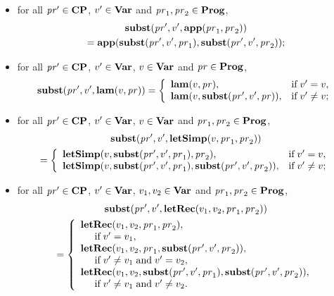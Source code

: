 \begin{itemize}
\item for all $\mathit{pr}'\in\mathbf{CP}$, $v'\in\mathbf{Var}$ and $\mathit{pr}_1,\mathit{pr}_2\in\mathbf{Prog}$,
  \begin{multline*}
    \mathbf{subst}(\mathit{pr}',v',\mathbf{app}(\mathit{pr}_1,\mathit{pr}_2)) \\
    = \mathbf{app}(\mathbf{subst}(\mathit{pr}',v',\mathit{pr}_1),\mathbf{subst}(\mathit{pr}',v',\mathit{pr}_2)) ;
  \end{multline*}

\item for all $\mathit{pr}'\in\mathbf{CP}$, $v'\in\mathbf{Var}$, $v\in\mathbf{Var}$ and
  $\mathit{pr}\in\mathbf{Prog}$,
  \begin{displaymath}
    \subst(\pr',v',\proglam(v,\pr)) =
    \casesdef{\proglam(v,\pr),}{\eqtxtr{if} v'=v ,}%
    {\proglam(v,\subst(\pr',v',\pr)),}{\eqtxtr{if} v'\neq v ;}
  \end{displaymath}

\item for all $\mathit{pr}'\in\mathbf{CP}$, $v'\in\mathbf{Var}$, $v\in\mathbf{Var}$ and
  $\mathit{pr}_1,\mathit{pr}_2\in\mathbf{Prog}$,
  \begin{multline*}
    \subst(\pr',v',\progletSimp(v,\pr_1,\pr_2)) \\
    = \casesdef{\progletSimp(v,\subst(\pr',v',\pr_1),\pr_2),}%
    {\eqtxtr{if} v'=v,}%
    {\progletSimp(v,\subst(\pr',v',\pr_1),\subst(\pr',v',\pr_2)),}%
    {\eqtxtr{if} v'\neq v;}%
  \end{multline*}

\item for all $\mathit{pr}'\in\mathbf{CP}$, $v'\in\mathbf{Var}$, $v_1,v_2\in\mathbf{Var}$ and
  $\mathit{pr}_1,\mathit{pr}_2\in\mathbf{Prog}$,
  \begin{multline*}
    \mathbf{subst}(\mathit{pr}',v',\mathbf{letRec}(v_1,v_2,\mathit{pr}_1,\mathit{pr}_2)) \\
    = \left\{ \begin{array}{l}
        \mathbf{letRec}(v_1,v_2,\mathit{pr}_1,\mathit{pr}_2), \\
        \hspace*{.5cm}\allowbreak\mbox{if}\allowbreak\; v'=v_1, \\
        \mathbf{letRec}(v_1,v_2,\mathit{pr}_1,\mathbf{subst}(\mathit{pr}',v',\mathit{pr}_2)), \\
        \hspace*{.5cm}\allowbreak\mbox{if}\allowbreak\; v'\neq v_1\;\allowbreak\mbox{and}\allowbreak\; v'=v_2 , \\
        \mathbf{letRec}(v_1,v_2,\mathbf{subst}(\mathit{pr}',v',\mathit{pr}_1),
          \mathbf{subst}(\mathit{pr}',v',\mathit{pr}_2)), \\
        \hspace*{.5cm}\allowbreak\mbox{if}\allowbreak\; v'\neq v_1\;\allowbreak\mbox{and}\allowbreak\; v'\neq v_2 .
      \end{array} \right.
  \end{multline*}
\end{itemize}

